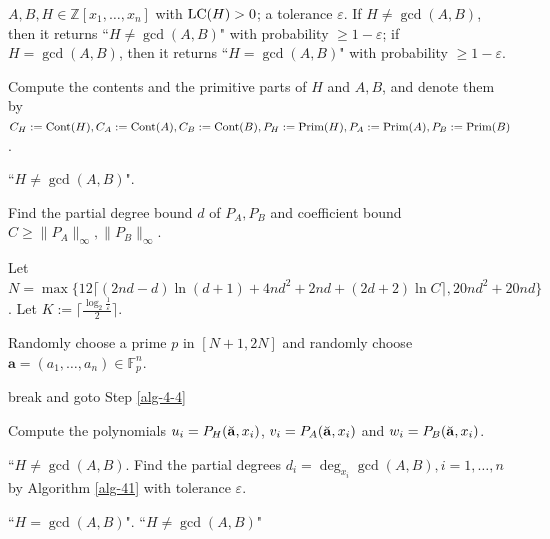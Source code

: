 \documentclass[final,20pt]{elsarticle}
\def\Z{{\mathbb Z}}
\def\F{{\mathbb{F}}}
\def\LC{\hbox{\rm{LC}}}
\def\Cont{\hbox{\rm{Cont}}}
\def\Prim{\hbox{\rm{Prim}}}
\begin{document}
\begin{algorithm}[H]
\caption{Verifying  whether  $H\overset{\text{?}}=\gcd(A,B)$.}\label{alg-4}
\begin{algorithmic}[1]
\REQUIRE  $A,B,H\in \Z[x_1,\dots,x_n]$ with $\LC(H)>0$; a tolerance $\varepsilon$.
\ENSURE If $H\neq \gcd(A,B)$, then it returns ``$H\neq \gcd(A,B)$" with probability $\geq 1-\varepsilon$; if $H=\gcd(A,B)$, then it returns ``$H=\gcd(A,B)$" with probability $\geq 1-\varepsilon$.



\STATE Compute the contents and the primitive parts of $H$ and $A,B$, and denote them by $C_{H}:=\Cont(H),C_A:=\Cont(A),C_B:=\Cont(B),P_{H}:=\Prim(H),P_A:=\Prim(A),P_B:=\Prim(B)$.\label{alg-4-2}\

\label{alg-4-21}
\RETURN ``$H\neq \gcd(A,B)$".
\ENDIF

\STATE Find the partial degree bound $d$ of $P_A,P_B$ and coefficient bound $C\geq \|P_A\|_\infty,  \|P_B\|_\infty$.\

\STATE Let $N=\max\{ 12
\lceil (2nd-d)\ln(d+1)+4nd^2+2nd+(2d+2)\ln C\rceil,20nd^2+20nd\}$. Let $K:=\lceil \frac{\log_2 \frac{1}{\varepsilon}}{2}\rceil$.\label{alg-4-3}\

\STATE Randomly choose a prime $p$ in $[N+1,2N]$ and randomly choose $\mathbf{a}=(a_1,\dots,a_{n})\in \F^{n}_p$.\label{alg-4-6}


\IF{$\LC(H)(\Breve{\mathbf{a}},x_i)=0$}
\STATE break and goto Step \ref{alg-4-4}
\ENDIF


\STATE Compute the polynomials $u_i=P_{H}(\Breve{\mathbf{a}},x_i)$, $v_i=P_A(\Breve{\mathbf{a}},x_i)$ and  $w_i=P_B(\Breve{\mathbf{a}},x_i)$.\label{alg-4-8}

\RETURN ``$H\neq \gcd(A,B)$.\label{alg-4-10}\label{alg-4-12}
\ENDIF
\ENDFOR \label{alg-4-131}
\ENDFOR \label{alg-4-132}
\STATE Find the partial degrees $d_i=\deg_{x_i}\gcd(A,B),i=1,\dots,n$ by Algorithm \ref{alg-41} with tolerance $\varepsilon$.\label{alg-4-16}\

\RETURN ``$H=\gcd(A,B)$".\label{alg-4-17}
\ELSE \RETURN ``$H\neq\gcd(A,B)$"\label{alg-4-18}
\ENDIF

\end{algorithmic}
\end{algorithm}
\end{document}
